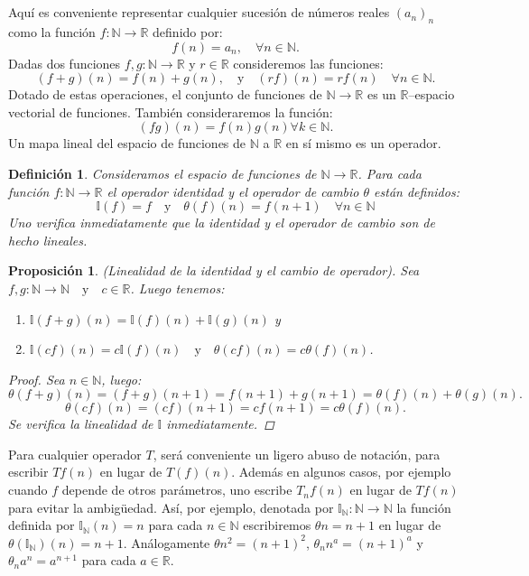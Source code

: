 \documentclass{article}
\newtheorem{defi}{Definición}[section]
\newtheorem{prop}{Proposición}[section]
\begin{document}
	\section{}
	Aquí es conveniente representar cualquier sucesión de números reales $(a_{n})_{n} $ como la función $f\colon\mathds{N}\rightarrow\mathds{R}$ definido por: \[ f(n)=a_{n},\quad\forall n\in\mathds{N}. \] Dadas dos funciones $f,g\colon\mathds{N}\rightarrow\mathds{R}$ y $r\in\mathds{R} $ consideremos las funciones: \[ (f+g)(n)=f(n)+g(n),\quad\text{y}\quad(rf)(n)=rf(n)\quad\forall n\in\mathds{N}. \] Dotado de estas operaciones, el conjunto de funciones de $\mathds{N}\rightarrow\mathds{R}$ es un $\mathds{R}$--espacio vectorial de funciones. También consideraremos la función: \[ (fg)(n)=f(n)g(n)\forall k\in\mathbb{N}. \] Un mapa lineal del espacio de funciones de $\mathds{N}$ a $ \mathds{R}$ en sí mismo es un operador.
	
	\begin{defi}
		Consideramos el espacio de funciones de $\mathds{N}\to\mathds{R}$. Para cada función $f\colon\mathds{N}\rightarrow\mathds{R}$ el operador identidad y el operador de cambio $\theta$ están definidos:
 $$
	\mathds{I}(f)=f\quad\text{y}\quad\theta(f)(n)=f(n+1)\quad\forall n\in\mathds{N}
 $$
 Uno verifica inmediatamente que la identidad y el operador de cambio son de hecho lineales.
	\end{defi}

\begin{prop}(Linealidad de la identidad y el cambio de operador).
	Sea $ f,g\colon\mathds{N}\to\mathds{N}\quad\text{y}\quad c\in\mathds{R}$. Luego tenemos:
	\begin{enumerate}
		\item $\mathds{I}\left(f+g\right)(n)=\mathds{I}(f)(n)+\mathds{I}(g)(n)$ y
		\item $\mathds{I}\left(cf\right)(n)=c\mathds{I}(f)(n)\quad\text{y}\quad \theta\left(cf\right)(n)=c\theta(f)(n)$.
	\end{enumerate}
	\begin{proof}
		Sea $n\in\mathds{N}$, luego:
		$$
		\theta(f+g)(n)=(f+g)(n+1)=f(n+1)+g(n+1)=\theta(f)(n)+\theta(g)(n).
		$$
		$$
		\theta(cf)(n)=(cf)(n+1)=cf(n+1)=c\theta(f)(n).
		$$
		Se verifica la linealidad de $\mathds{I}$ inmediatamente.
	\end{proof}
\end{prop}

Para cualquier operador $T$, será conveniente un ligero abuso de notación, para escribir $Tf(n)$ en lugar de $T(f)(n)$. Además en algunos casos, por ejemplo cuando $f$ depende de otros parámetros, uno escribe $T_{n}f(n)$ en lugar de $Tf(n)$ para evitar la ambigüedad. Así, por ejemplo, denotada por $\mathds{I}_{\mathds{N}}\colon\mathds{N}\rightarrow\mathds{N}$ la función definida por $\mathds{I}_{\mathds{N}}(n)=n$ para cada $n\in\mathds{N} $ escribiremos $\theta n=n+1$ en lugar de $\theta(\mathds{I}_{\mathds{N}})(n)=n+1$. Análogamente $\theta n^{2}=(n+1)^{2}$, $\theta_{n}n^{a}=(n+1)^{a}$ y $\theta_{n}a^{n}=a^{n+1}$ para cada $a\in\mathds{R}$.
\end{document}

